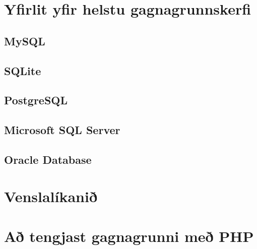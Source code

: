 \documentclass[nohyper,notoc,justified]{tufte-book}
\begin{document}
\section{Yfirlit yfir helstu gagnagrunnskerfi}
\subsection{MySQL}
\subsection{SQLite}
\subsection{PostgreSQL}
\subsection{Microsoft SQL Server}
\subsection{Oracle Database}
\section{Venslalíkanið}
\section{Að tengjast gagnagrunni með PHP}
\end{document}
